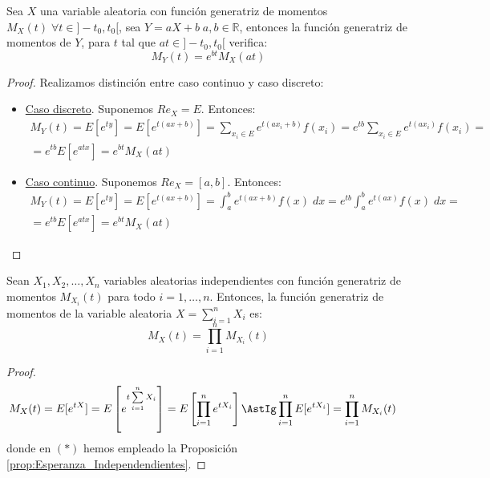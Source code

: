 \begin{prop}
    Sea $X$ una variable aleatoria con función generatriz de momentos $M_X(t)\;\forall t \in ]-t_0, t_0[$, sea $Y = aX +b\;a, b \in \mathbb{R}$, entonces la función generatriz de momentos de $Y$, para $t$ tal que $at \in ]-t_0, t_0[$ verifica:
    \begin{equation*}
        M_Y(t) = e^{bt}M_X(at)
    \end{equation*}
\end{prop}
\begin{proof}
    Realizamos distinción entre caso continuo y caso discreto:
    \begin{itemize}
        \item \underline{Caso discreto}. Suponemos $Re_X = E$. Entonces:
        \begin{multline*}
            M_Y(t) = E[e^{ty}] = E[e^{t(ax+b)}] = \sum_{x_i\in E} e^{t(ax_i+b)}f(x_i)
            = e^{tb}\sum_{x_i\in E} e^{t(ax_i)}f(x_i)
            =\\= e^{tb}E[e^{atx}] = e^{bt}M_X(at)
        \end{multline*}

        \item \underline{Caso continuo}. Suponemos $Re_X = [a,b]$. Entonces:
        \begin{multline*}
            M_Y(t) = E[e^{ty}] = E[e^{t(ax+b)}] = \int_a^b e^{t(ax+b)}f(x)\;dx
            = e^{tb}\int_a^b e^{t(ax)}f(x)\;dx
            =\\= e^{tb}E[e^{atx}] = e^{bt}M_X(at)
        \end{multline*}
    \end{itemize}
\end{proof}



\begin{prop}\label{prop:generatriz_momentos_independientes}
    Sean $X_1,X_2,\ldots,X_n$ variables aleatorias independientes con función generatriz de momentos $M_{X_i}(t)$ para todo $i=1,\dots,n$. Entonces, la función generatriz de momentos de la variable aleatoria $X=\sum\limits_{i=1}^n X_i$ es:
    \begin{equation*}
        M_X(t)=\prod_{i=1}^n M_{X_i}(t)
    \end{equation*}
\end{prop}
\begin{proof}
    \begin{equation*}\begin{split}
        M_X(t)
        &= E[e^{tX}]
        = E\left[e^{t\sum\limits_{i=1}^n X_i}\right]
        = E\left[\prod_{i=1}^n e^{tX_i}\right]
        \AstIg \prod_{i=1}^n E[e^{tX_i}]
        = \prod_{i=1}^n M_{X_i}(t)
    \end{split}\end{equation*}
    donde en $(\ast)$ hemos empleado la Proposición \ref{prop:Esperanza_Independendientes}.
\end{proof}